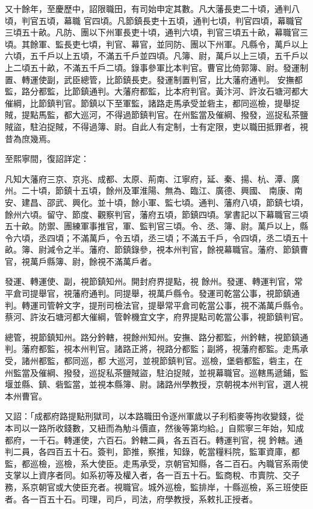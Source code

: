 \begin{pinyinscope}
 又十餘年，至慶歷中，詔限職田，有司始申定其數。凡大藩長吏二十頃，通判八頃，判官五頃，幕職
 官四頃。凡節鎮長吏十五頃，通判七頃，判官四頃，幕職官三頃五十畝。凡防、團以下州軍長吏十頃，通判六頃，判官三頃五十畝，幕職官三頃。其餘軍、監長吏七頃，判官、幕官，並同防、團以下州軍。凡縣令，萬戶以上六頃，五千戶以上五頃，不滿五千戶並四頃。凡簿、尉，萬戶以上三頃，五千戶以上二頃五十畝，不滿五千戶二頃。錄事參軍比本判官。曹官比倚郭簿、尉。發運制置、轉運使副，武臣總管，比節鎮長吏。發運制置判官，比大藩府通判。
 安撫都監，路分都監，比節鎮通判。大藩府都監，比本府判官。黃汴河、許汝石塘河都大催綱，比節鎮判官。節鎮以下至軍監，諸路走馬承受並砦主，都同巡檢，提舉捉賊，提點馬監，都大巡河，不得過節鎮判官。在州監當及催綱、撥發，巡捉私茶鹽賊盜，駐泊捉賊，不得過簿、尉。自此人有定制，士有定限，吏以職田抵罪者，視昔為庶幾焉。



 至熙寧間，復詔詳定：



 凡知大藩府三京、京兆、成都、太原、荊南、江寧府，延、秦、揚、杭、潭、廣州。二十頃，節鎮十五頃，餘州及軍淮陽、無為、臨江、廣德、興國、
 南康、南安、建昌、邵武、興化。並十頃，餘小軍、監七頃。通判、藩府八頃，節鎮七頃，餘州六頃。留守、節度、觀察判官，藩府五頃，節鎮四頃。掌書記以下幕職官三頃五十畝。防禦、團練軍事推官，軍、監判官三頃。令、丞、簿、尉。萬戶以上，縣令六頃，丞四頃；不滿萬戶，令五頃，丞三頃；不滿五千戶，令四頃，丞二頃五十畝。簿、尉減令之半。藩府、節鎮錄參，視本州判官，餘視幕職官。藩府、節鎮曹官，視萬戶縣簿、尉，餘視不滿萬戶者。



 發運、轉運使、副，視節鎮知州。開封府界提點，視
 餘州。發運、轉運判官，常平倉司提舉官，視藩府通判。同提舉，視萬戶縣令。發運司乾當公事，視節鎮通判。轉運司管幹文字，提刑司檢法官，提舉常平倉司乾當公事，視不滿萬戶縣令。蔡河、許汝石塘河都大催綱，管幹機宜文字，府界提點司乾當公事，視節鎮判官。



 總管，視節鎮知州。路分鈐轄，視餘州知州。安撫、路分都監，州鈐轄，視節鎮通判。藩府都監，視本州判官。諸路正將，視路分都監；副將，視藩府都監。走馬承受，諸州都監，都同巡，都
 大巡河，並視節鎮判官。巡檢，堡砦都監，砦主，在州監當及催綱、撥發，巡捉私茶鹽賊盜，駐泊捉賊，並視幕職官。巡轄馬遞鋪，監堰並縣、鎮、砦監當，並視本縣簿、尉。諸路州學教授，京朝視本州判官，選人視本州曹官。



 又詔：「成都府路提點刑獄司，以本路職田令逐州軍歲以子利稻麥等拘收變錢，從本司以一路所收錢數，又紐而為觔斗價直，然後等第均給。」自熙寧三年始，知成都府，一千石。轉運使，六百石。鈐轄二員，各五百石。轉運判官，視
 鈐轄。通判二員，各四百五十石。簽判，節推，察推，知錄，乾當糧料院，監軍資庫，都監，都巡檢，巡檢，系大使臣。走馬承受，京朝官知縣，各二百石。內職官系兩使支掌以上資序者同。如系初等及權入者，各一百五十石。監商稅、市賣院、交子務，系京朝官或大使臣充者。視職官。城外巡檢，監排岸，十縣巡檢，系三班使臣者。各一百五十石。司理，司戶，司法，府學教授，系敕扎正授者。




\end{pinyinscope}
